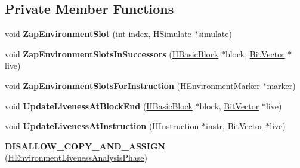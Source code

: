 \subsection*{Private Member Functions}
\begin{DoxyCompactItemize}
\item 
void {\bfseries Zap\+Environment\+Slot} (int index, \hyperlink{classv8_1_1internal_1_1_h_simulate}{H\+Simulate} $\ast$simulate)\hypertarget{classv8_1_1internal_1_1_h_environment_liveness_analysis_phase_aea5f4b798c85b063efca702d70e3742a}{}\label{classv8_1_1internal_1_1_h_environment_liveness_analysis_phase_aea5f4b798c85b063efca702d70e3742a}

\item 
void {\bfseries Zap\+Environment\+Slots\+In\+Successors} (\hyperlink{classv8_1_1internal_1_1_h_basic_block}{H\+Basic\+Block} $\ast$block, \hyperlink{classv8_1_1internal_1_1_bit_vector}{Bit\+Vector} $\ast$live)\hypertarget{classv8_1_1internal_1_1_h_environment_liveness_analysis_phase_a98a5629b8ae9d9a700f157691a7228eb}{}\label{classv8_1_1internal_1_1_h_environment_liveness_analysis_phase_a98a5629b8ae9d9a700f157691a7228eb}

\item 
void {\bfseries Zap\+Environment\+Slots\+For\+Instruction} (\hyperlink{classv8_1_1internal_1_1_h_environment_marker}{H\+Environment\+Marker} $\ast$marker)\hypertarget{classv8_1_1internal_1_1_h_environment_liveness_analysis_phase_aab5650801b33471f6bac944410494921}{}\label{classv8_1_1internal_1_1_h_environment_liveness_analysis_phase_aab5650801b33471f6bac944410494921}

\item 
void {\bfseries Update\+Liveness\+At\+Block\+End} (\hyperlink{classv8_1_1internal_1_1_h_basic_block}{H\+Basic\+Block} $\ast$block, \hyperlink{classv8_1_1internal_1_1_bit_vector}{Bit\+Vector} $\ast$live)\hypertarget{classv8_1_1internal_1_1_h_environment_liveness_analysis_phase_a58bc2999ef6786f86eb39c216627f305}{}\label{classv8_1_1internal_1_1_h_environment_liveness_analysis_phase_a58bc2999ef6786f86eb39c216627f305}

\item 
void {\bfseries Update\+Liveness\+At\+Instruction} (\hyperlink{classv8_1_1internal_1_1_h_instruction}{H\+Instruction} $\ast$instr, \hyperlink{classv8_1_1internal_1_1_bit_vector}{Bit\+Vector} $\ast$live)\hypertarget{classv8_1_1internal_1_1_h_environment_liveness_analysis_phase_a22ba8cee5d18ba3b580e5cf8ed78ed61}{}\label{classv8_1_1internal_1_1_h_environment_liveness_analysis_phase_a22ba8cee5d18ba3b580e5cf8ed78ed61}

\item 
{\bfseries D\+I\+S\+A\+L\+L\+O\+W\+\_\+\+C\+O\+P\+Y\+\_\+\+A\+N\+D\+\_\+\+A\+S\+S\+I\+GN} (\hyperlink{classv8_1_1internal_1_1_h_environment_liveness_analysis_phase}{H\+Environment\+Liveness\+Analysis\+Phase})\hypertarget{classv8_1_1internal_1_1_h_environment_liveness_analysis_phase_a7b559c2f72d6cae09f662ca8d8f99f3b}{}\label{classv8_1_1internal_1_1_h_environment_liveness_analysis_phase_a7b559c2f72d6cae09f662ca8d8f99f3b}

\end{DoxyCompactItemize}
